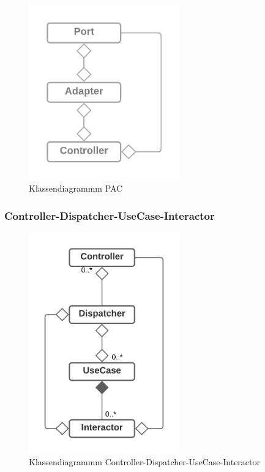 \documentclass{article}
\begin{document}
    \begin{figure}[H]
       \centering
       \includegraphics[width=6.5cm]{./images/Port-Adapter-Contoller.png}
        \caption[Klassendiagrammm PAC]{Klassendiagrammm PAC \footnotemark}
        \label{fig:CDPAC}
    \end{figure}

    \subsubsection{Controller-Dispatcher-UseCase-Interactor}
    
    \begin{figure}[H]
        \centering
        \includegraphics[width=6.5cm]{./images/Controller-Dispatcher-UseCase-Interactor.png}
         \caption[Klassendiagrammm Controller-Dispatcher-UseCase-Interactor]{Klassendiagrammm Controller-Dispatcher-UseCase-Interactor \footnotemark}
         \label{fig:CDCDUI}
     \end{figure}
\end{document}
